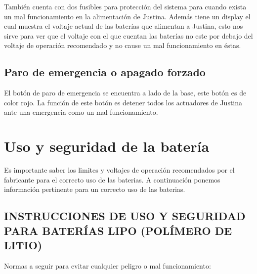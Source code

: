\documentclass[user_manual.tex]{subfiles}
\begin{document}
También cuenta con dos fusibles para protección del sistema para cuando exista un mal funcionamiento en la alimentación de 
Justina. Además tiene un display el cual muestra el voltaje actual de las baterías que alimentan a Justina, esto nos sirve
para ver que el voltaje con el que cuentan las baterías no este por debajo del voltaje de operación recomendado y no cause
un mal funcionamiento en éstas.

\subsection{Paro de emergencia o apagado forzado}
El botón de paro de emergencia se encuentra a lado de la base, este botón es de color rojo. La función de este botón es 
detener todos los actuadores de Justina ante una emergencia como un mal funcionamiento.

\section{Uso y seguridad de la batería}

Es importante saber los limites y voltajes de operación recomendados por el fabricante para el correcto uso de las baterias. 
A continuación ponemos información pertinente para un correcto uso de las baterias.
\subsection{INSTRUCCIONES DE USO Y SEGURIDAD PARA BATERÍAS LIPO (POLÍMERO DE LITIO)}
Normas a seguir para evitar cualquier peligro o mal funcionamiento:
\end{document}
